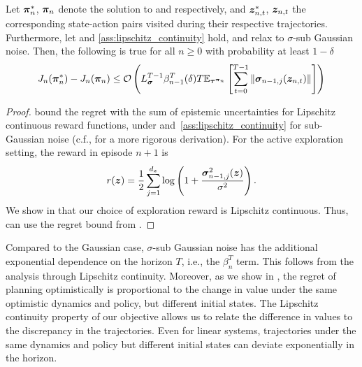 \begin{lemma}
\label{lem:simple_regret_planning}
    Let ${\bm{\pi}}^*_n$, ${\bm{\pi}}_n$ denote the solution to  and  
 respectively, and ${\bm{z}}^*_{n, t}$, ${\bm{z}}_{n, t}$ the corresponding state-action pairs visited during their respective trajectories. Furthermore, let  and \ref{ass:lipschitz_continuity} hold, and relax  to $\sigma$-sub Gaussian noise. Then, the following is true for all $n\geq 0$ with probability at least $1-\delta$
    \begin{equation*}
        J_n({\bm{\pi}}_n^*) - J_n({\bm{\pi}}_n) \leq {\mathcal{O}}\left(L^{T-1}_{{\bm{\sigma}}} \beta^T_{n-1}(\delta) T \mathbb{E}_{{\bm{\tau}}^{{\bm{\pi}}_n}}\left[\sum^{T-1}_{t=0} \left\lVert {\bm{\sigma}}_{n-1, j}({\bm{z}}_{n, t})\right\rVert \right]\right)
    \end{equation*}
\end{lemma}
\begin{proof}
    \citet[Lemma~5]{curi2020efficient} bound the regret with the sum of epistemic uncertainties for Lipschitz continuous reward functions, under  and~\ref{ass:lipschitz_continuity} for sub-Gaussian noise (c.f., \citet[Theorem 3.5]{rothfuss2023hallucinated} for a more rigorous derivation). For the active exploration setting, the reward in episode $n+1$ is 
    \begin{equation*}
        r({\bm{z}}) = \frac{1}{2}\sum^{d_x}_{j=1} \log \left(1 + \frac{{\bm{\sigma}}_{n-1, j}^2({\bm{z}})}{\sigma^{2}}\right).
    \end{equation*}
    We show in  that our choice of exploration reward is Lipschitz continuous. Thus, can use the regret bound from \citet{curi2020efficient}.
\end{proof}

Compared to the Gaussian case, $\sigma$-sub Gaussian noise has the additional exponential dependence on the horizon $T$, i.e., the 
$\beta^T_n$ term. This follows from the analysis through Lipschitz continuity. Moreover, as we show in , the regret of planning optimistically is proportional to the change in value under the same optimistic dynamics and policy, but different initial states. The Lipschitz continuity property of our objective allows us to relate the difference in values to the discrepancy in the trajectories. Even for linear systems, trajectories under the same dynamics and policy but different initial states can deviate exponentially in the horizon. 

